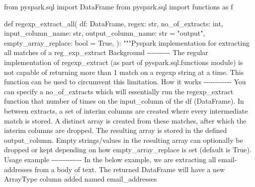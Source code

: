\documentclass[
  letterpaper,
  DIV=11,
  numbers=noendperiod]{scrreprt}
\newenvironment{Shaded}{\begin{snugshade}}{\end{snugshade}}
\newcommand{\BuiltInTok}[1]{\textcolor[rgb]{0.00,0.23,0.31}{#1}}
\newcommand{\CommentTok}[1]{\textcolor[rgb]{0.37,0.37,0.37}{#1}}
\newcommand{\ImportTok}[1]{\textcolor[rgb]{0.00,0.46,0.62}{#1}}
\newcommand{\KeywordTok}[1]{\textcolor[rgb]{0.00,0.23,0.31}{#1}}
\newcommand{\NormalTok}[1]{\textcolor[rgb]{0.00,0.23,0.31}{#1}}
\newcommand{\OperatorTok}[1]{\textcolor[rgb]{0.37,0.37,0.37}{#1}}
\newcommand{\StringTok}[1]{\textcolor[rgb]{0.13,0.47,0.30}{#1}}
\newcommand{\VariableTok}[1]{\textcolor[rgb]{0.07,0.07,0.07}{#1}}
\begin{document}
\begin{Shaded}
\begin{Highlighting}[]
\ImportTok{from}\NormalTok{ pyspark.sql }\ImportTok{import}\NormalTok{ DataFrame}
\ImportTok{from}\NormalTok{ pyspark.sql }\ImportTok{import}\NormalTok{ functions }\ImportTok{as}\NormalTok{ f}


\KeywordTok{def}\NormalTok{ regexp\_extract\_all(}
\NormalTok{    df: DataFrame,}
\NormalTok{    regex: }\BuiltInTok{str}\NormalTok{,}
\NormalTok{    no\_of\_extracts: }\BuiltInTok{int}\NormalTok{,}
\NormalTok{    input\_column\_name: }\BuiltInTok{str}\NormalTok{,}
\NormalTok{    output\_column\_name: }\BuiltInTok{str} \OperatorTok{=} \StringTok{"output"}\NormalTok{,}
\NormalTok{    empty\_array\_replace: }\BuiltInTok{bool} \OperatorTok{=} \VariableTok{True}\NormalTok{,}
\NormalTok{):}
    \CommentTok{"""Pyspark implementation for extracting all matches of a reg\_exp\_extract}
\CommentTok{    }
\CommentTok{    Background}
\CommentTok{    {-}{-}{-}{-}{-}{-}{-}{-}{-}{-}}
\CommentTok{    The regular implementation of regexp\_extract (as part of pyspark.sql.functions module)}
\CommentTok{    is not capable of returning more than 1 match on a regexp string at a time. This }
\CommentTok{    function can be used to circumvent this limitation.}
\CommentTok{    }
\CommentTok{    How it works}
\CommentTok{    {-}{-}{-}{-}{-}{-}{-}{-}{-}{-}{-}{-}}
\CommentTok{    You can specify a \textasciigrave{}no\_of\_extracts\textasciigrave{} which will essentially run the regexp\_extract }
\CommentTok{    function that number of times on the \textasciigrave{}input\_column\textasciigrave{} of the \textasciigrave{}df\textasciigrave{} (\textasciigrave{}DataFrame\textasciigrave{}). }
\CommentTok{    In between extracts, a set of interim columns are created where every }
\CommentTok{    intermediate match is stored. A distinct array is created from these matches, }
\CommentTok{    after which the interim columns are dropped. The resulting array is stored in }
\CommentTok{    the defined \textasciigrave{}output\_column\textasciigrave{}. Empty strings/values in the resulting array can }
\CommentTok{    optionally be dropped or kept depending on how \textasciigrave{}empty\_array\_replace\textasciigrave{} is set }
\CommentTok{    (default is True).}
\CommentTok{    }
\CommentTok{    Usage example}
\CommentTok{    {-}{-}{-}{-}{-}{-}{-}{-}{-}{-}{-}{-}{-}}
\CommentTok{    In the below example, we are extracting all email{-}addresses from a body of text.}
\CommentTok{    The returned DataFrame will have a new ArrayType column added named \textasciigrave{}email\_addresses\textasciigrave{}}

\end{Highlighting}
\end{Shaded}
\end{document}
